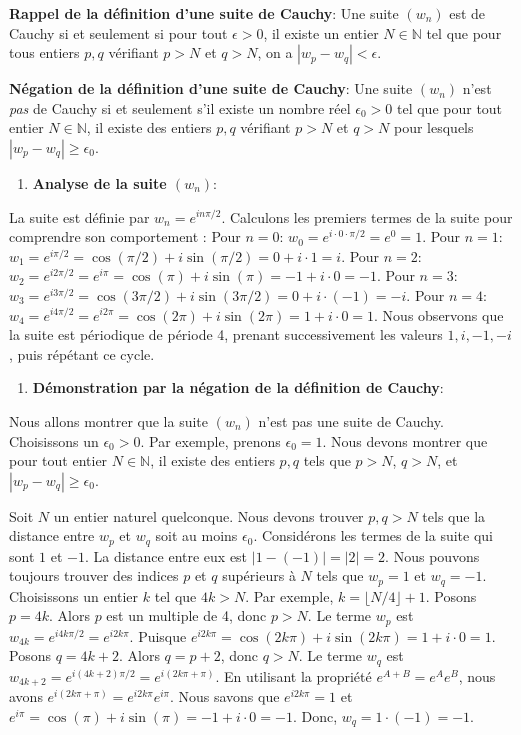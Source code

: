 \documentclass[a4paper,11pt]{report}
\begin{document}
    \textbf{Rappel de la définition d'une suite de Cauchy}:
    Une suite $(w_n)$ est de Cauchy si et seulement si pour tout $\epsilon > 0$, il existe un entier $N \in \mathbb{N}$ tel que pour tous entiers $p, q$ vérifiant $p > N$ et $q > N$, on a $|w_p - w_q| < \epsilon$.

    \textbf{Négation de la définition d'une suite de Cauchy}:
    Une suite $(w_n)$ n'est \textit{pas} de Cauchy si et seulement s'il existe un nombre réel $\epsilon_0 > 0$ tel que pour tout entier $N \in \mathbb{N}$, il existe des entiers $p, q$ vérifiant $p > N$ et $q > N$ pour lesquels $|w_p - w_q| \ge \epsilon_0$.
\begin{enumerate}
\item \textbf{Analyse de la suite $(w_n)$}:
\end{enumerate}
    La suite est définie par $w_n = e^{i n \pi / 2}$. Calculons les premiers termes de la suite pour comprendre son comportement :
    Pour $n=0$: $w_0 = e^{i \cdot 0 \cdot \pi / 2} = e^0 = 1$.
    Pour $n=1$: $w_1 = e^{i \pi / 2} = \cos(\pi/2) + i \sin(\pi/2) = 0 + i \cdot 1 = i$.
    Pour $n=2$: $w_2 = e^{i 2 \pi / 2} = e^{i \pi} = \cos(\pi) + i \sin(\pi) = -1 + i \cdot 0 = -1$.
    Pour $n=3$: $w_3 = e^{i 3 \pi / 2} = \cos(3\pi/2) + i \sin(3\pi/2) = 0 + i \cdot (-1) = -i$.
    Pour $n=4$: $w_4 = e^{i 4 \pi / 2} = e^{i 2 \pi} = \cos(2\pi) + i \sin(2\pi) = 1 + i \cdot 0 = 1$.
    Nous observons que la suite est périodique de période 4, prenant successivement les valeurs $1, i, -1, -i$, puis répétant ce cycle.
\begin{enumerate}
\item \textbf{Démonstration par la négation de la définition de Cauchy}:
\end{enumerate}
    Nous allons montrer que la suite $(w_n)$ n'est pas une suite de Cauchy.
    Choisissons un $\epsilon_0 > 0$. Par exemple, prenons $\epsilon_0 = 1$.
    Nous devons montrer que pour tout entier $N \in \mathbb{N}$, il existe des entiers $p, q$ tels que $p > N$, $q > N$, et $|w_p - w_q| \ge \epsilon_0$.

    Soit $N$ un entier naturel quelconque.
    Nous devons trouver $p, q > N$ tels que la distance entre $w_p$ et $w_q$ soit au moins $\epsilon_0$.
    Considérons les termes de la suite qui sont $1$ et $-1$. La distance entre eux est $|1 - (-1)| = |2| = 2$.
    Nous pouvons toujours trouver des indices $p$ et $q$ supérieurs à $N$ tels que $w_p = 1$ et $w_q = -1$.
    Choisissons un entier $k$ tel que $4k > N$. Par exemple, $k = \lfloor N/4 \rfloor + 1$.
    Posons $p = 4k$. Alors $p$ est un multiple de 4, donc $p > N$.
    Le terme $w_p$ est $w_{4k} = e^{i 4k \pi / 2} = e^{i 2k \pi}$. Puisque $e^{i 2k \pi} = \cos(2k\pi) + i \sin(2k\pi) = 1 + i \cdot 0 = 1$.
    Posons $q = 4k+2$. Alors $q = p+2$, donc $q > N$.
    Le terme $w_q$ est $w_{4k+2} = e^{i (4k+2) \pi / 2} = e^{i (2k \pi + \pi)}$.
    En utilisant la propriété $e^{A+B} = e^A e^B$, nous avons $e^{i (2k \pi + \pi)} = e^{i 2k \pi} e^{i \pi}$.
    Nous savons que $e^{i 2k \pi} = 1$ et $e^{i \pi} = \cos(\pi) + i \sin(\pi) = -1 + i \cdot 0 = -1$.
    Donc, $w_q = 1 \cdot (-1) = -1$.
\end{document}
